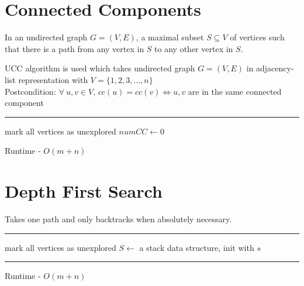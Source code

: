 \documentclass{article}
\begin{document}
	\section{Connected Components}
	In an undirected graph $G = (V,E)$, a maximal subset $S \subseteq V$  of vertices such that there is a path from any vertex in $S$ to any other vertex in $S$.
	
	UCC algorithm is used which takes undirected graph $G = (V,E)$ in adjacency-list representation with $V = \{1, 2, 3, \ldots, n\}$ \\
	Postcondition: $\forall \: u,v \in V, \, cc(u) = cc(v) \iff u,v$ are in the same connected component
	
	\begin{algorithm}[H]
		\SetAlgoLined
		\caption{Undirected Connected Components (UCC)}
		\BlankLine
		\hrule
		\BlankLine
		mark all vertices as unexplored \;
		$numCC \leftarrow 0$ \;
	\end{algorithm} 
	Runtime - $O(m+n)$
	
	\section{Depth First Search}
	Takes one path and only backtracks when absolutely necessary.
	
	\begin{algorithm}[H]
		\SetAlgoLined
		\caption{Iterative Implementation of DFS}
		\BlankLine
		\hrule
		\BlankLine
		mark all vertices as unexplored \;
		$S \leftarrow$ a stack data structure, init with $s$ \;
	\end{algorithm}
	
	\pagebreak
	
	\begin{algorithm}[H]
		\SetAlgoLined
		\caption{Recursive Implementation of DFS}
		\BlankLine
		\hrule
		\BlankLine
	\end{algorithm} 
	Runtime - $O(m + n)$
	
\end{document}

